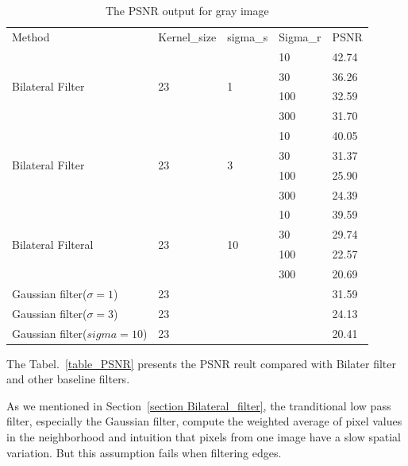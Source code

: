 \documentclass[12pt]{article}
\begin{document}
\begin{table}[H]
\centering
\begin{tabular}{lllll}
\cline{1-5}
Method & Kernel\_size & sigma\_s & Sigma\_r & PSNR  \\ \cline{1-1}
\cline{1-5}
\multirow{4}{*}{Bilateral Filter}   & \multirow{4}{*}{23} & \multirow{4}{*}{1}                               
                                  & 10      & 42.74 \\
       &             &            & 30      & 36.26     \\
       &             &            & 100     & 32.59     \\
       &             &            & 300     & 31.70     \\
\cline{1-5}
\multirow{4}{*}{Bilateral Filter}   & \multirow{4}{*}{23} & \multirow{4}{*}{3}  
                                  & 10       &40.05     \\
      &              &            & 30       & 31.37     \\
      &              &            & 100      & 25.90     \\
      &              &            & 300      & 24.39     \\
\cline{1-5}                                 
\multirow{4}{*}{Bilateral Filteral} & \multirow{4}{*}{23} & \multirow{4}{*}{10} 
                                  & 10       & 39.59     \\
     &               &            & 30       & 29.74     \\
     &               &            & 100      & 22.57     \\
     &               &            & 300      & 20.69     \\
\cline{1-5}
Gaussian filter($\sigma = 1$)    & 23    &      &       & 31.59    \\
Gaussian filter($\sigma = 3$)    & 23    &      &       & 24.13     \\
Gaussian filter($sigma = 10$)    & 23    &      &       & 20.41    
\end{tabular}
\caption{The PSNR output for gray image}
\label{table_PSNR_gray}
\end{table}
The Tabel.~\ref{table_PSNR} presents the PSNR reult compared with Bilater filter and other baseline filters.


As we mentioned in Section~\ref{section Bilateral_filter}, the tranditional low pass filter, especially the Gaussian filter, compute the weighted average of pixel values in the neighborhood and intuition that pixels from one image have a slow spatial variation. 
But this assumption fails when filtering edges.
\end{document}
